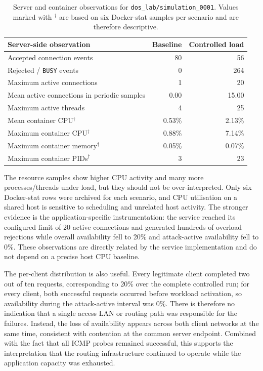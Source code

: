 \begin{table}[htbp]
\centering
\small
\begin{tabular}{lrr}
\toprule
\textbf{Server-side observation} & \textbf{Baseline} & \textbf{Controlled load} \\
\midrule
Accepted connection events & 80 & 56 \\
Rejected / \texttt{BUSY} events & 0 & 264 \\
Maximum active connections & 1 & 20 \\
Mean active connections in periodic samples & 0.00 & 15.00 \\
Maximum active threads & 4 & 25 \\
Mean container CPU$^{\dagger}$ & 0.53\% & 2.13\% \\
Maximum container CPU$^{\dagger}$ & 0.88\% & 7.14\% \\
Maximum container memory$^{\dagger}$ & 0.05\% & 0.07\% \\
Maximum container PIDs$^{\dagger}$ & 3 & 23 \\
\bottomrule
\end{tabular}
\caption{Server and container observations for \texttt{dos\_lab/simulation\_0001}. Values marked with $^{\dagger}$ are based on six Docker-stat samples per scenario and are therefore descriptive.}
\label{tab:server-comparison}
\end{table}

The resource samples show higher CPU activity and many more processes/threads
under load, but they should not be over-interpreted. Only six Docker-stat rows
were archived for each scenario, and CPU utilisation on a shared host is
sensitive to scheduling and unrelated host activity. The stronger evidence is
the application-specific instrumentation: the service reached its configured
limit of 20 active connections and generated hundreds of overload rejections
while overall availability fell to 20\% and attack-active availability fell to
0\%. These observations are
directly related by the service implementation and do not depend on a precise
host CPU baseline.

The per-client distribution is also useful. Every legitimate client completed
two out of ten requests, corresponding to 20\% over the complete controlled
run; for every client, both successful requests occurred before workload
activation, so availability during the attack-active interval was 0\%.
There is therefore no indication that a single access LAN or routing path was
responsible for the failures. Instead, the loss of availability appears across
both client networks at the same time, consistent with contention at the common
server endpoint. Combined with the fact that all ICMP probes remained
successful, this supports the interpretation that the routing infrastructure
continued to operate while the application capacity was exhausted.

